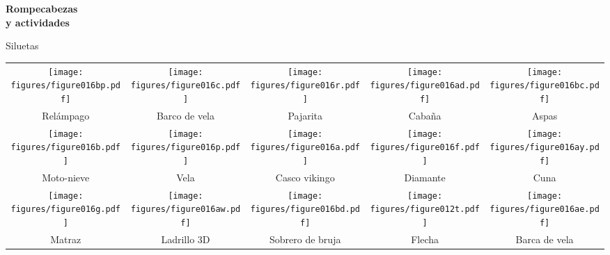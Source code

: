 \documentclass[14pt,aspectratio=169,usenames,dvipsnames]{beamer}
\begin{document}

    \begin{frame}{}
        \begin{center}
            \textbf{\Huge Rompecabezas\\y actividades}\\
        \end{center}
    \end{frame}


    \begin{frame}{Siluetas}
        \vspace{-1em}
        \begin{center}
            \vspace{-0.3em}

            {\footnotesize
            \begin{tabular}{ccccc}
                \texttt{[image: figures/figure016bp.pdf]}\;\;\;\;\; &
                \texttt{[image: figures/figure016c.pdf]}  &
                \texttt{[image: figures/figure016r.pdf]}  &
                \texttt{[image: figures/figure016ad.pdf]} &
                \;\;\texttt{[image: figures/figure016bc.pdf]} \\
                Relámpago & Barco de vela & Pajarita & Cabaña & Aspas \\[4ex]
                \texttt{[image: figures/figure016b.pdf]}  &
                \texttt{[image: figures/figure016p.pdf]}  &
                \texttt{[image: figures/figure016a.pdf]}  &
                \texttt{[image: figures/figure016f.pdf]}  &
                \texttt{[image: figures/figure016ay.pdf]} \\
                Moto-nieve & Vela & \;Casco vikingo & Diamante & Cuna\\[3.5ex]
                \texttt{[image: figures/figure016g.pdf]}  &
                \texttt{[image: figures/figure016aw.pdf]} &
                \!\texttt{[image: figures/figure016bd.pdf]} \!&
                \texttt{[image: figures/figure012t.pdf]} &
                \texttt{[image: figures/figure016ae.pdf]} \\
                Matraz & Ladrillo 3D\;\; & Sobrero de bruja & Flecha & Barca de vela\\
            \end{tabular}}
        \end{center}
    \end{frame}
\end{document}
